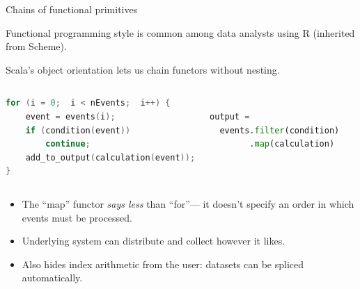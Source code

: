 \documentclass{beamer}
\begin{document}
\begin{frame}[fragile]{Chains of functional primitives}

Functional programming style is common among data analysts using R (inherited from Scheme).

\vspace{0.2 cm}
Scala's object orientation lets us chain functors without nesting.

\vspace{0.2 cm}
\begin{columns}
\begin{lstlisting}[language=c,frame=single]
for (i = 0;  i < nEvents;  i++) {
    event = events(i);
    if (condition(event))
        continue;
    add_to_output(calculation(event));
}
\end{lstlisting}
\begin{lstlisting}[language=python,frame=single]

output =
  events.filter(condition)
        .map(calculation)


\end{lstlisting}
\end{columns}

\begin{itemize}
\item The ``map'' functor {\it says less} than ``for''--- it doesn't specify an order in which events must be processed.
\item Underlying system can distribute and collect however it likes.
\item Also hides index arithmetic from the user: datasets can be spliced automatically.
\end{itemize}
\end{frame}
\end{document}
